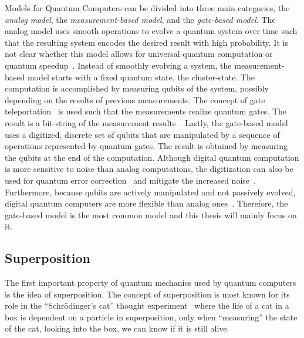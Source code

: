 Models for Quantum Computers can be divided into three main categories, the \emph{analog model}, the \emph{measurement-based model}, and the \emph{gate-based model}. The analog model uses smooth operations to evolve a quantum system over time such that the resulting system encodes the desired result with high probability. It is not clear whether this model allows for universal quantum computation or quantum speedup~\cite{DiCh20}. Instead of smoothly evolving a system, the measurement-based model starts with a fixed quantum state, the cluster-state. The computation is accomplished by measuring qubits of the system, possibly depending on the results of previous measurements. The concept of gate teleportation~ is used such that the measurements realize quantum gates. The result is a bit-string of the measurement results~\cite{DiCh20, Niel06}. Lastly, the gate-based model uses a digitized, discrete set of qubits that are manipulated by a sequence of operations represented by quantum gates. The result is obtained by measuring the qubits at the end of the computation. Although digital quantum computation is more sensitive to noise than analog computations, the digitization can also be used for quantum error correction~\cite{DMN13} and mitigate the increased noise~\cite{DiCh20}. Furthermore, because qubits are actively manipulated and not passively evolved, digital quantum computers are more flexible than analog ones~\cite{RDB*22}. Therefore, the gate-based model is the most common model and this thesis will mainly focus on it. 

\subsection{Superposition} 
\label{sec:background_superposition}
The first important property of quantum mechanics used by quantum computers is the idea of superposition. The concept of superposition is most known for its role in the ``Schrödinger's cat'' thought experiment~\cite{Wine13} where the life of a cat in a box is dependent on a particle in superposition, only when ``measuring'' the state of the cat, \ie looking into the box, we can know if it is still alive. 

